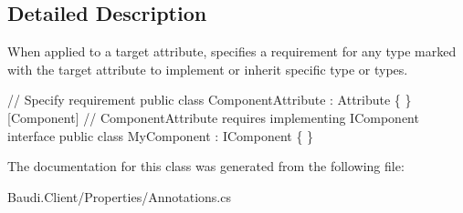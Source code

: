 \subsection{Detailed Description}
When applied to a target attribute, specifies a requirement for any type marked with the target attribute to implement or inherit specific type or types. 


\begin{DoxyCode}
 \textcolor{comment}{// Specify requirement}
\textcolor{keyword}{public} \textcolor{keyword}{class} ComponentAttribute : Attribute \{ \}
[Component] \textcolor{comment}{// ComponentAttribute requires implementing IComponent interface}
\textcolor{keyword}{public} \textcolor{keyword}{class }MyComponent : IComponent \{ \}
\end{DoxyCode}


The documentation for this class was generated from the following file\+:\begin{DoxyCompactItemize}
\item 
Baudi.\+Client/\+Properties/Annotations.\+cs\end{DoxyCompactItemize}
